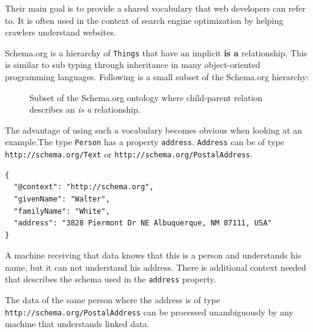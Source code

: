 Their main goal is to provide a shared vocabulary that web developers can refer to. It is often used in the context of search engine optimization by helping crawlers understand websites.

Schema.org is a hierarchy of \lstinline{Things} that have an implicit \textbf{is a} relationship. This is similar to sub typing through inheritance in many object-oriented programming languages. Following is a small subset of the Schema.org hierarchy:

\begin{figure}[!htb]
  \caption{\label{fig:schemaorg} Subset of the Schema.org ontology where child-parent relation describes an \textit{is a} relationship.}
\end{figure}

The advantage of using such a vocabulary becomes obvious when looking at an example.The type \lstinline{Person} has a property \lstinline{address}. \lstinline{Address} can be of type \lstinline{http://schema.org/Text} or \lstinline{http://schema.org/PostalAddress}.

\lstset{language=JSON}
\begin{lstlisting}[caption=A person with an address of type Text]
{
  "@context": "http://schema.org",
  "givenName": "Walter",
  "familyName": "White",
  "address": "3828 Piermont Dr NE Albuquerque, NM 87111, USA"
}
\end{lstlisting}

A machine receiving that data knows that this is a person and understands his name, but it can not understand his address. There is additional context needed that describes the schema used in the \lstinline{address} property.

The data of the same person where the address is of type \lstinline{http://schema.org/PostalAddress} can be processed unambiguously by any machine that understands linked data.

